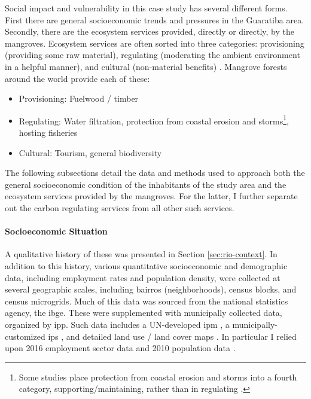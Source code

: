 Social impact and vulnerability in this case study has several different forms. First there are general socioeconomic trends and pressures in the Guaratiba area. Secondly, there are the ecosystem services provided, directly or directly, by the mangroves. Ecosystem services are often sorted into three categories: provisioning (providing some raw material), regulating (moderating the ambient environment in a helpful manner), and cultural (non-material benefits) \cite{haines-youngCommonInternationalClassification2018}. Mangrove forests around the world provide each of these:

\begin{itemize}[itemsep=0pt,parsep=0pt]
	\item{Provisioning: Fuelwood / timber}
	\item{Regulating: Water filtration, protection from coastal erosion and storms\footnote{Some studies place protection from coastal erosion and storms into a fourth category, supporting/maintaining, rather than in regulating \cite{getznerEcosystemServicesMangrove2020}.}, hosting fisheries}
	\item{Cultural: Tourism, general biodiversity}
\end{itemize}

The following subsections detail the data and methods used to approach both the general socioeconomic condition of the inhabitants of the study area and the ecosystem services provided by the mangroves. For the latter, I further separate out the carbon regulating services from all other such services.

\paragraph{Socioeconomic Situation} \leavevmode\newline

A qualitative history of these was presented in Section \ref{sec:rio-context}. In addition to this history, various quantitative socioeconomic and demographic data, including employment rates and population density, were collected at several geographic scales, including bairros (neighborhoods), census blocks, and census microgrids. Much of this data was sourced from the national statistics agency, the \ac{ibge}. These were supplemented with municipally collected data, organized by \ac{ipp}. Such data includes a UN-developed \ac{ipm} \cite{oxfordpovertyandhumandevelopmentinitiativeChartingPathewaysOut2020}, a municipally-customized \ac{ips} \cite{puliciRelatorioMetodologicoIndice2016}, and detailed land use / land cover maps \cite{regoAutomaticClassificationLand2003}. In particular I relied upon 2016 employment sector data \cite{institutopereirapassosNumeroEmpregadosPor2018} and 2010 population data \cite{institutopereirapassosPopulacaoResidentePor2018}.

